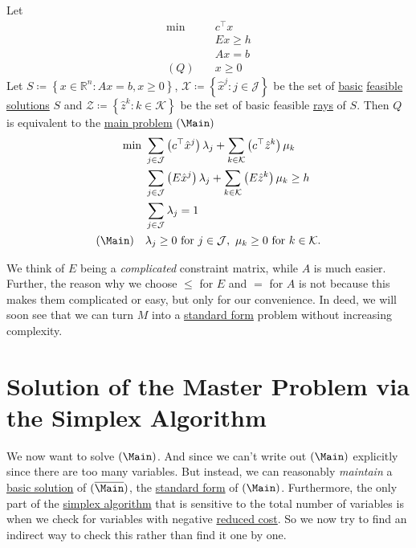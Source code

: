 \begin{theorem}\label{thm:decomposition}
	Let
	\[
		\begin{aligned}
			\min~    & c^{\top}x \\
			         & Ex \geq h \\
			         & Ax = b    \\
			(Q)\quad & x\geq 0
		\end{aligned}
	\]
	Let \(S\coloneqq \left\{ x\in\mathbb{R}^n\colon Ax = b, x\geq 0 \right\}\), \(\mathcal{X} \coloneqq \left\{\hat{x}^j\colon j\in\mathcal{J} \right\}\) be the set of \hyperref[def:basic-solution]{basic} \hyperref[def:feasible-solution]{feasible solutions} \(S\) and \(\mathcal{Z} \coloneqq \left\{\hat{z}^k\colon k\in\mathcal{K} \right\}\) be the set of basic feasible \hyperref[def:ray]{rays} of \(S\). Then \(Q\) is equivalent to the \hyperref[def:main-problem]{main problem} \((\Main)\)
	\[
		\begin{aligned}
			\min~        & \sum\limits_{j\in\mathcal{J}}\left(c^{\top}\hat{x}^j\right)\lambda_{j} + \sum\limits_{k\in\mathcal{K}}\left(c^{\top} \hat{z}^k  \right)\mu_k \\
			             & \sum\limits_{j\in\mathcal{J}}\left(E\hat{x}^j\right)\lambda_{j} + \sum\limits_{k\in\mathcal{K}}\left(E \hat{z}^k \right)\mu_k \geq h         \\
			             & \sum\limits_{j\in\mathcal{J}}\lambda_{j} = 1                                                                                                 \\
			(\Main)\quad & \lambda_{j}\geq 0 \text{ for }j\in\mathcal{J},\ \mu_k\geq 0 \text{ for }k\in\mathcal{K}.
		\end{aligned}
	\]
\end{theorem}

\begin{remark}
	We think of \(E\) being a \emph{complicated} constraint matrix, while \(A\) is much easier. Further, the reason why we choose \(\leq \) for \(E\) and \(=\) for \(A\) is not because this makes them complicated or easy, but only for our convenience. In deed, we will soon see that we can turn \(M\) into a \hyperref[def:standard-form]{standard form} problem without increasing complexity.
\end{remark}

\section{Solution of the Master Problem via the Simplex Algorithm}
We now want to solve \((\Main)\). And since we can't write out \((\Main)\) explicitly since there are too many variables. But instead, we can reasonably \emph{maintain} a \hyperref[def:basic-solution]{basic solution} of \((\overline{\Main})\), the \hyperref[def:standard-form]{standard form} of \((\Main)\). Furthermore, the only part of the \hyperref[algo:simplex-algorithm]{simplex algorithm} that is sensitive to the total number of variables is when we check for variables with negative \hyperref[def:reduced-cost]{reduced cost}. So we now try to find an indirect way to check this rather than find it one by one.

